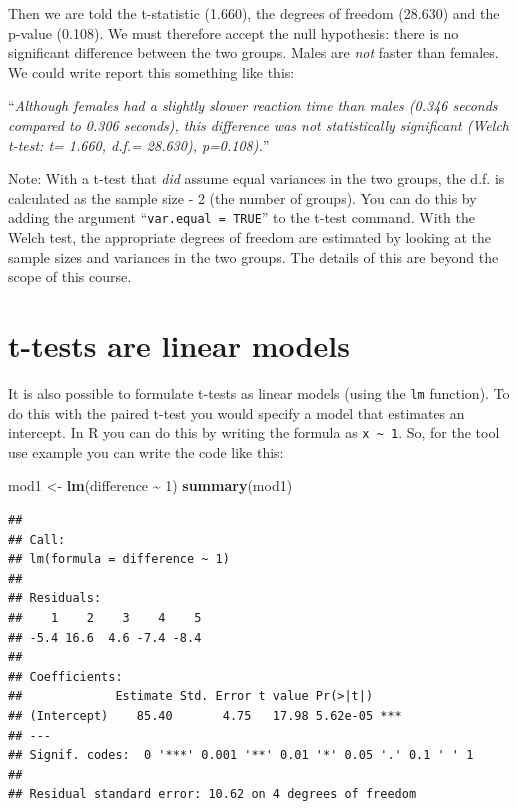 \documentclass[
  a4paperpaper,
]{book}
\newenvironment{Shaded}{\begin{snugshade}}{\end{snugshade}}
\newcommand{\DecValTok}[1]{\textcolor[rgb]{0.00,0.00,0.81}{#1}}
\newcommand{\KeywordTok}[1]{\textcolor[rgb]{0.13,0.29,0.53}{\textbf{#1}}}
\newcommand{\NormalTok}[1]{#1}
\newcommand{\OperatorTok}[1]{\textcolor[rgb]{0.81,0.36,0.00}{\textbf{#1}}}
\newcommand{\StringTok}[1]{\textcolor[rgb]{0.31,0.60,0.02}{#1}}
\begin{document}
Then we are told the t-statistic (1.660), the degrees of freedom (28.630) and the p-value (0.108). We must therefore accept the null hypothesis: there is no significant difference between the two groups. Males are \emph{not} faster than females. We could write report this something like this:

``\emph{Although females had a slightly slower reaction time than males (0.346 seconds compared to 0.306 seconds), this difference was not statistically significant (Welch t-test: t= 1.660, d.f.= 28.630), p=0.108).}''

Note: With a t-test that \emph{did} assume equal variances in the two groups, the d.f. is calculated as the sample size - 2 (the number of groups). You can do this by adding the argument ``\texttt{var.equal\ =\ TRUE}'' to the t-test command. With the Welch test, the appropriate degrees of freedom are estimated by looking at the sample sizes and variances in the two groups. The details of this are beyond the scope of this course.

\hypertarget{t-tests-are-linear-models}{%
\section{t-tests are linear models}\label{t-tests-are-linear-models}}

It is also possible to formulate t-tests as linear models (using the \texttt{lm} function). To do this with the paired t-test you would specify a model that estimates an intercept. In R you can do this by writing the formula as \texttt{x\ \textasciitilde{}\ 1}. So, for the tool use example you can write the code like this:

\begin{Shaded}
\begin{Highlighting}[]
\NormalTok{mod1 \textless{}{-}}\StringTok{ }\KeywordTok{lm}\NormalTok{(difference }\OperatorTok{\textasciitilde{}}\StringTok{ }\DecValTok{1}\NormalTok{)}
\KeywordTok{summary}\NormalTok{(mod1)}
\end{Highlighting}
\end{Shaded}

\begin{verbatim}
## 
## Call:
## lm(formula = difference ~ 1)
## 
## Residuals:
##    1    2    3    4    5 
## -5.4 16.6  4.6 -7.4 -8.4 
## 
## Coefficients:
##             Estimate Std. Error t value Pr(>|t|)    
## (Intercept)    85.40       4.75   17.98 5.62e-05 ***
## ---
## Signif. codes:  0 '***' 0.001 '**' 0.01 '*' 0.05 '.' 0.1 ' ' 1
## 
## Residual standard error: 10.62 on 4 degrees of freedom
\end{verbatim}
\end{document}
